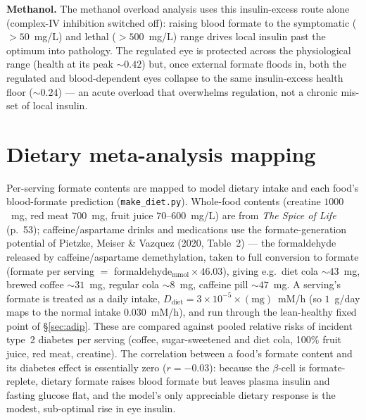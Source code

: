 \documentclass[11pt]{article}
\begin{document}
\textbf{Methanol.} The methanol overload analysis uses this insulin-excess route
alone (complex-IV inhibition switched off): raising blood formate to the
symptomatic ($>50$~mg/L) and lethal ($>500$~mg/L) range drives local insulin past
the optimum into pathology. The regulated eye is protected across the physiological
range (health at its peak $\sim0.42$) but, once external formate floods in, both
the regulated and blood-dependent eyes collapse to the same insulin-excess health
floor ($\sim0.24$) --- an acute overload that overwhelms regulation, not a chronic
mis-set of local insulin.

\section{Dietary meta-analysis mapping}\label{sec:diet}

Per-serving formate contents are mapped to model dietary intake and each food's
blood-formate prediction (\texttt{make\_diet.py}). Whole-food contents (creatine
$1000$~mg, red meat $700$~mg, fruit juice $70$--$600$~mg/L) are from
\textit{The Spice of Life} (p.~53); caffeine/aspartame drinks and medications use
the formate-generation potential of Pietzke, Meiser \& Vazquez (2020, Table~2) ---
the formaldehyde released by caffeine/aspartame demethylation, taken to full
conversion to formate (formate per serving $=$ formaldehyde$_{\mathrm{mmol}}\times
46.03$), giving e.g.\ diet cola ${\sim}43$~mg, brewed coffee ${\sim}31$~mg, regular
cola ${\sim}8$~mg, caffeine pill ${\sim}47$~mg. A serving's formate is treated as a
daily intake, $D_{\mathrm{diet}}=3\times10^{-5}\times(\text{mg})$~mM/h (so
$1$~g/day maps to the normal intake $0.030$~mM/h), and run through the lean-healthy
fixed point of \S\ref{sec:adip}. These are compared against pooled relative risks
of incident type~2 diabetes per serving (coffee, sugar-sweetened and diet cola,
100\% fruit juice, red meat, creatine). The correlation between a food's formate
content and its diabetes effect is essentially zero ($r=-0.03$): because the
$\beta$-cell is formate-replete, dietary formate raises blood formate but leaves
plasma insulin and fasting glucose flat, and the model's only appreciable dietary
response is the modest, sub-optimal rise in eye insulin.

\end{document}
